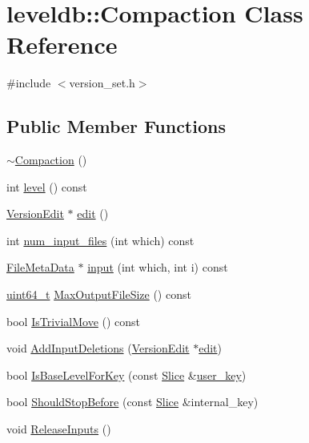 \hypertarget{classleveldb_1_1_compaction}{}\section{leveldb\+:\+:Compaction Class Reference}
\label{classleveldb_1_1_compaction}


{\ttfamily \#include $<$version\+\_\+set.\+h$>$}

\subsection*{Public Member Functions}
\begin{DoxyCompactItemize}
\item 
\hyperlink{classleveldb_1_1_compaction_ad29d60feea9dd53f54a2bd9301dbd9c4}{$\sim$\+Compaction} ()
\item 
int \hyperlink{classleveldb_1_1_compaction_aaf72769cc8dabece3e513399425f91fa}{level} () const 
\item 
\hyperlink{classleveldb_1_1_version_edit}{Version\+Edit} $\ast$ \hyperlink{classleveldb_1_1_compaction_a122e4f7b4fdb6c0d1862624742b34b3d}{edit} ()
\item 
int \hyperlink{classleveldb_1_1_compaction_a75bcfebad0f838380ef7f63dc083e992}{num\+\_\+input\+\_\+files} (int which) const 
\item 
\hyperlink{structleveldb_1_1_file_meta_data}{File\+Meta\+Data} $\ast$ \hyperlink{classleveldb_1_1_compaction_a989d147c33f2993d4503c56ea0ee3a78}{input} (int which, int i) const 
\item 
\hyperlink{stdint_8h_aaa5d1cd013383c889537491c3cfd9aad}{uint64\+\_\+t} \hyperlink{classleveldb_1_1_compaction_a02ecf935a684691ef864a8997bfab793}{Max\+Output\+File\+Size} () const 
\item 
bool \hyperlink{classleveldb_1_1_compaction_a9d88e4a33ba63749cb0f0f04fbc74968}{Is\+Trivial\+Move} () const 
\item 
void \hyperlink{classleveldb_1_1_compaction_abb1acdc9b882a7497603b13386e7e1a7}{Add\+Input\+Deletions} (\hyperlink{classleveldb_1_1_version_edit}{Version\+Edit} $\ast$\hyperlink{classleveldb_1_1_compaction_a122e4f7b4fdb6c0d1862624742b34b3d}{edit})
\item 
bool \hyperlink{classleveldb_1_1_compaction_ae982beb6ee52d92de76a363ef0eefc29}{Is\+Base\+Level\+For\+Key} (const \hyperlink{classleveldb_1_1_slice}{Slice} \&\hyperlink{version__set_8cc_afced2118ae0bf03db7c7e75a21cfd004}{user\+\_\+key})
\item 
bool \hyperlink{classleveldb_1_1_compaction_a07624423bb512fedb358a008a38fa0b9}{Should\+Stop\+Before} (const \hyperlink{classleveldb_1_1_slice}{Slice} \&internal\+\_\+key)
\item 
void \hyperlink{classleveldb_1_1_compaction_a87ec90747d22dce0d103149db1ecf709}{Release\+Inputs} ()
\end{DoxyCompactItemize}
